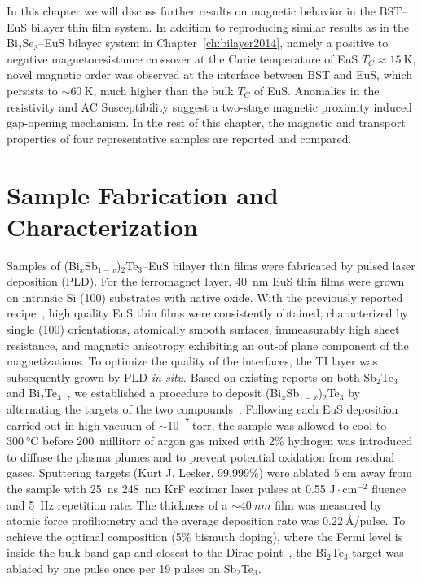 In this chapter we will discuss further results on magnetic behavior in the BST--EuS bilayer thin film system. In addition to reproducing similar results as in the Bi$_2$Se$_3$--EuS bilayer system in Chapter~\ref{ch:bilayer2014}, namely a positive to negative magnetoresistance crossover at the Curie temperature of EuS $T_C\approx15~\mathrm{K}$, novel magnetic order was observed at the interface between BST and EuS, which persists to $\sim 60~\mathrm{K}$, much higher than the bulk $T_C$ of EuS. Anomalies in the resistivity and AC Susceptibility suggest a two-stage magnetic proximity induced gap-opening mechanism. In the rest of this chapter, the magnetic and transport properties of four representative samples are reported and compared.

\section{Sample Fabrication and Characterization}
Samples of (Bi$_{x}$Sb$_{1-x}$)$_2$Te$_3$--EuS bilayer thin films were fabricated by pulsed laser deposition (PLD). For the ferromagnet layer, 40~nm EuS thin films were grown on intrinsic Si (100) substrates with native oxide. With the previously reported recipe~\cite{EuS_PLD}, high quality EuS thin films were consistently obtained, characterized by single (100) orientations, atomically smooth surfaces, immeasurably high sheet resistance, and magnetic anisotropy exhibiting an out-of plane component of the magnetizations. To optimize the quality of the interfaces, the TI layer was subsequently grown by PLD \textit{in situ}. Based on existing reports on both Sb$_2$Te$_3$ and Bi$_2$Te$_3$~\cite{telluride_PLD1, telluride_PLD2}, we established a procedure to deposit (Bi$_{x}$Sb$_{1-x}$)$_2$Te$_3$ by alternating the targets of the two compounds~\cite{PLD_alt_target2, PLD_alt_target}. Following each EuS deposition carried out in high vacuum of $\sim10^{-7}~\mathrm{torr}$,  the sample was allowed to cool to $\SI{300}{\degreeCelsius}$ before 200~millitorr of argon gas mixed with 2\% hydrogen was introduced to diffuse the plasma plumes and to prevent potential oxidation from residual gases. Sputtering targets (Kurt J. Lesker, 99.999\%) were ablated $\SI{5}{\cm}$ away from the sample with 25~ns 248~nm KrF excimer laser pulses at 0.55 $\mathrm{J\cdot{}cm^{-2}}$ fluence and 5~Hz repetition rate. The thickness of a $\sim\SI{40}{nm}$ film was measured by atomic force profiliometry and the average deposition rate was $\SI{0.22}{\angstrom}$/pulse. To achieve the optimal composition (5$\%$ bismuth doping), where the Fermi level is inside the bulk band gap and closest to the Dirac point~\cite{ZhangJS2011}, the Bi$_2$Te$_3$ target was ablated by one pulse once per 19 pulses on Sb$_2$Te$_3$. 


